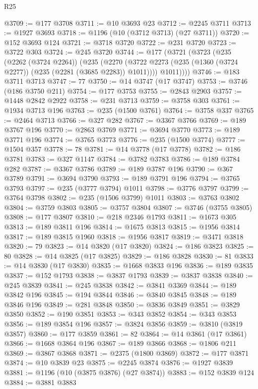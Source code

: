 \begin{lexlean}{R25}
\begin{coremodule}
@3709 := @177 @3708
@3711 := @10 @3693 @23
@3712 := @2245 @3711
@3713 := @1927 @3693
@3718 := @1196 (@10 (@3712 @3713) (@27 @3711))
@3720 := @152 @3693 @124
@3721 := @3718 @3720
@3722 := @231 @3720
@3723 := @3722 @303
@3724 := @245 @3720
@3744 := @177
    (@3721
      (@3723
        (@235
          (@2262 (@3724 @2264))
          (@235
            (@2270 (@3722 @2273 (@235 (@1360 (@3724 @2277)) (@235 (@2281 (@3685 @2283)) @1011))))
            @1011))))
@3746 := @183 @3711 @3713
@3747 := 77
@3750 := @14 @3747 (@17 @3747)
@3753 := @3746 (@186 @3750 @211)
@3754 := @177 @3753
@3755 := @2843 @2903
@3757 := @1448 @2842 @2922
@3758 := @231 @3713
@3759 := @3758 @303
@3761 := @1934 @3713 @196
@3763 := @235 (@1500 @3761)
@3764 := @3758 @337
@3765 := @2464 @3713
@3766 := @327 @282
@3767 := @3367 @3766
@3769 := @189 @3767 @196
@3770 := @2863 @3769
@3771 := @3694 @3770
@3773 := @189 @3771 @196
@3774 := @3765 @3773
@3776 := @235 (@1500 @3774)
@3777 := @1504 @357
@3778 := 78
@3781 := @14 @3778 (@17 @3778)
@3782 := @186 @3781
@3783 := @327 @1147
@3784 := @3782 @3783
@3786 := @189 @3784 @282
@3787 := @3367 @3786
@3789 := @189 @3787 @196
@3790 := @367 @3789
@3791 := @3694 @3790
@3793 := @189 @3791 @196
@3794 := @3765 @3793
@3797 := @235 (@3777 @3794) @1011
@3798 := @3776 @3797
@3799 := @3764 @3798
@3802 := @235 (@1506 @3799) @1011
@3803 := @3763 @3802
@3804 := @3759 @3803
@3805 := @3757 @3804
@3807 := @3746 (@3755 @3805)
@3808 := @177 @3807
@3810 := @218 @2346 @1793
@3811 := @1673 @305
@3813 := @189 @3811 @196
@3814 := @1675 @3813
@3815 := @1956 @3814
@3817 := @189 @3815 @1960
@3818 := @1956 @3817
@3819 := @3471 @3818
@3820 := 79
@3823 := @14 @3820 (@17 @3820)
@3824 := @186 @3823
@3825 := 80
@3828 := @14 @3825 (@17 @3825)
@3829 := @186 @3828
@3830 := 81
@3833 := @14 @3830 (@17 @3830)
@3835 := @1668 @3833 @196
@3836 := @189 @3835
@3837 := @152 @1793
@3838 := @3837 @1793
@3839 := @3837 @3838
@3840 := @245 @3839
@3841 := @245 @3838
@3842 := @3841 @3369
@3844 := @189 @3842 @196
@3845 := @194 @3844
@3846 := @3840 @3845
@3848 := @189 @3846 @196
@3849 := @281 @3848
@3850 := @3836 @3849
@3851 := @3829 @3850
@3852 := @190 @3851
@3853 := @343 @3852
@3854 := @343 @3853
@3856 := @189 @3854 @196
@3857 := @3824 @3856
@3859 := @3810 (@3819 @3857)
@3860 := @177 @3859
@3861 := 82
@3864 := @14 @3861 (@17 @3861)
@3866 := @1668 @3864 @196
@3867 := @189 @3866
@3868 := @1806 @211
@3869 := @3867 @3868
@3871 := @2375 (@1800 @3869)
@3872 := @177 @3871
@3874 := @10 @3839 @23
@3875 := @2245 @3874
@3876 := @1927 @3839
@3881 := @1196 (@10 (@3875 @3876) (@27 @3874))
@3883 := @152 @3839 @124
@3884 := @3881 @3883

\end{coremodule}
\end{lexlean}
